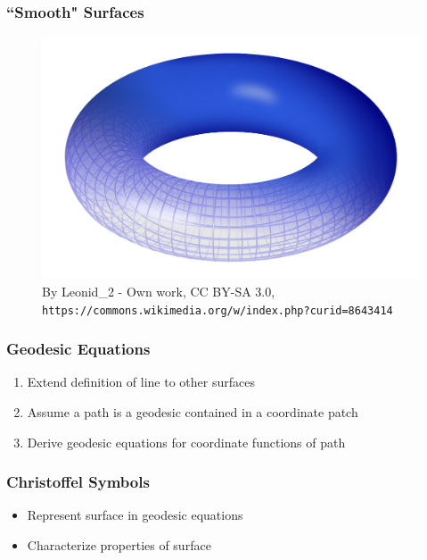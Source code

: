 \documentclass{beamer}
\begin{document}
\begin{frame}

	\frametitle{``Smooth" Surfaces}
	
	\begin{figure}
		\includegraphics[width=\textwidth]{images/Torus.png}
		\caption{By Leonid\_2 - Own work, CC BY-SA 3.0, \texttt{https://commons.wikimedia.org/w/index.php?curid=8643414}}
	\end{figure}
	
\end{frame}


\begin{frame}
	
	\frametitle{Geodesic Equations}
	
	\begin{enumerate}
		\item Extend definition of line to other surfaces
		\item Assume a path is a geodesic contained in a coordinate patch
		\item Derive geodesic equations for coordinate functions of path
	\end{enumerate}

\end{frame}


\begin{frame}
	
	\frametitle{Christoffel Symbols}
	
	\begin{itemize}
		\item Represent surface in geodesic equations
		\item Characterize properties of surface
	\end{itemize}
	
\end{frame}
\end{document}
